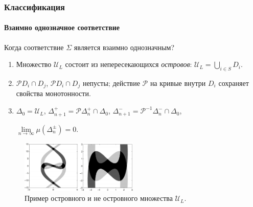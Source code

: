 \documentclass [10pt] {beamer}
\begin{document}
\begin{frame}
	\frametitle{Классификация}
	\framesubtitle{Взаимно однозначное соответствие}
	
	Когда соответствие $\Sigma$ является взаимно однозначным?\footnotemark[3]
	\begin{enumerate}
		\item Множество $\mathscr{U}_L$ состоит из непересекающихся {\it островов}: $\mathscr{U}_L = \bigcup_{i \in S} D_i$.
		\item $\mathcal{P} D_i \cap D_j$, $\mathcal{P} D_i \cap D_j$ непусты; действие $\mathcal{P}$ на кривые внутри $D_i$ сохраняет свойства монотонности.
		\item $\Delta_0 = \mathscr{U}_L$, \quad $\Delta_{n + 1}^+ = \mathcal{P} \Delta_n^+ \cap \Delta_0$, \quad $\Delta_{n + 1}^- = \mathcal{P}^{-1} \Delta_n^- \cap \Delta_0$,\begin{center}
				$\lim \limits_{n \to \infty} \mu( \Delta_n^{\pm} ) = 0$.
			\end{center} 
	\end{enumerate}
	
	\begin{figure}
		\includegraphics[width=0.5\textwidth]{pic/islands.pdf}
		\caption{Пример островного и не островного множества $\mathscr{U}_{L}$.}
		\label{pic:coding}
	\end{figure}
	
\end{frame}
\end{document}
